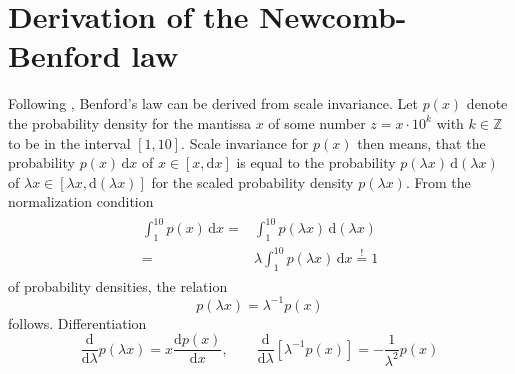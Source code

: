 \documentclass[a4paper,11pt, twocolumn]{article}
\begin{document}
\section{Derivation of the Newcomb-Benford law}
Following \cite{Burgos2021}, Benford's law can be derived from scale invariance. Let $p(x)$ denote the probability density for the mantissa $x$ of some number $z = x\cdot 10^k$ with $k \in \mathbb{Z}$ to be in the interval $[1,10]$. Scale invariance for $p(x)$ then means, that the probability $p(x)\,\mathrm{d}x$ of $x \in [x, \mathrm{d}x]$ is equal to the probability $p(\lambda x)\,\mathrm{d}(\lambda x)$ of $\lambda x \in [\lambda x, \mathrm{d}(\lambda x)]$ for the scaled probability density $p(\lambda x)$. From the normalization condition \begin{align}\begin{aligned}\label{eq:normalizationcondition}
	\int_{1}^{10} p(x)\,\mathrm{d}x =& \int_{1}^{10} p(\lambda x)\,\mathrm{d}(\lambda x) \\ =& \lambda \int_{1}^{10} p(\lambda x)\,\mathrm{d}x \overset{!}{=} 1
	\end{aligned}\end{align}
of probability densities, the relation \begin{equation}
	p(\lambda x) = \lambda^{-1}p(x)
\end{equation} follows. Differentiation \begin{equation}
\frac{\mathrm{d}}{\mathrm{d}\lambda} p(\lambda x) = x\frac{\mathrm{d}p(x)}{\mathrm{d}x}, \qquad \frac{\mathrm{d}}{\mathrm{d}\lambda}[\lambda^{-1}p(x)] = -\frac{1}{\lambda^2}p(x)
\end{equation}
\end{document}

